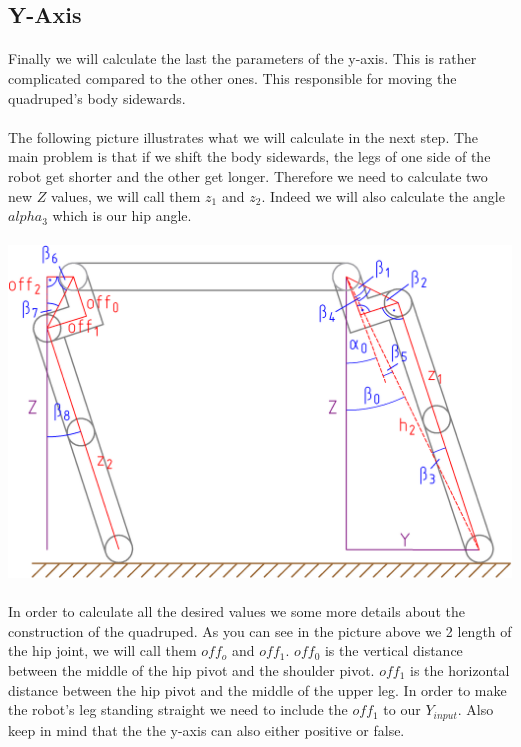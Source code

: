 \documentclass{article}
\begin{document}
    \subsection{Y-Axis}
    \paragraph{} %
    Finally we will calculate the last the parameters of the y-axis. This is rather complicated compared to the other ones. This responsible for moving the quadruped's body sidewards.
    
    \paragraph{}
    The following picture illustrates what we will calculate in the next step. The main problem is that if we shift the body sidewards, the legs of one side of the robot get shorter and the other get longer. Therefore we need to calculate two new $Z$ values, we will call them $z_1$ and $z_2$. Indeed we will also calculate the angle $alpha_3$ which is our hip angle.

    \paragraph{}
    \includegraphics[scale=0.2]{y-axis}

    \paragraph{}
    In order to calculate all the desired values we some more details about the construction of the quadruped. As you can see in the picture above we 2 length of the hip joint, we will call them $off_o$ and $off_1$. $off_0$ is the vertical distance between the middle of the hip pivot and the shoulder pivot. $off_1$ is the horizontal distance between the hip pivot and the middle of the upper leg. In order to make the robot's leg standing straight we need to include the $off_1$ to our $Y_{input}$. Also keep in mind that the the y-axis can also either positive or false.
\end{document}
